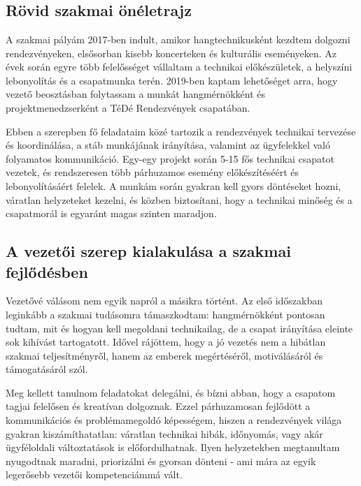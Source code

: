\chapter{\ManagementExperience}
\section{Rövid szakmai önéletrajz}

A szakmai pályám 2017-ben indult, amikor hangtechnikusként kezdtem dolgozni rendezvényeken, 
elsősorban kisebb koncerteken és kulturális eseményeken. Az évek során egyre több felelősséget vállaltam 
a technikai előkészületek, a helyszíni lebonyolítás és a csapatmunka terén. 2019-ben kaptam lehetőséget arra, 
hogy vezető beosztásban folytassam a munkát hangmérnökként és projektmenedzserként a TéDé Rendezvények csapatában.

Ebben a szerepben fő feladataim közé tartozik a rendezvények technikai tervezése és koordinálása, 
a stáb munkájának irányítása, valamint az ügyfelekkel való folyamatos kommunikáció. 
Egy-egy projekt során 5-15 fős technikai csapatot vezetek, és rendszeresen több párhuzamos esemény 
előkészítéséért és lebonyolításáért felelek. A munkám során gyakran kell gyors döntéseket hozni, 
váratlan helyzeteket kezelni, és közben biztosítani, hogy a technikai minőség és a csapatmorál is 
egyaránt magas szinten maradjon.

\section{A vezetői szerep kialakulása a szakmai fejlődésben}

Vezetővé válásom nem egyik napról a másikra történt. Az első időszakban leginkább a szakmai tudásomra 
támaszkodtam: hangmérnökként pontosan tudtam, mit és hogyan kell megoldani technikailag, 
de a csapat irányítása eleinte sok kihívást tartogatott. Idővel rájöttem, hogy a jó vezetés nem a hibátlan 
szakmai teljesítményről, hanem az emberek megértéséről, motiválásáról és támogatásáról szól.

Meg kellett tanulnom feladatokat delegálni, és bízni abban, hogy a csapatom tagjai felelősen és kreatívan dolgoznak. 
Ezzel párhuzamosan fejlődött a kommunikációs és problémamegoldó képességem, hiszen a rendezvények világa gyakran 
kiszámíthatatlan: váratlan technikai hibák, időnyomás, vagy akár ügyféloldali változtatások is előfordulhatnak. 
Ilyen helyzetekben megtanultam nyugodtnak maradni, priorizálni és gyorsan dönteni - ami mára az egyik legerősebb 
vezetői kompetenciámmá vált.

